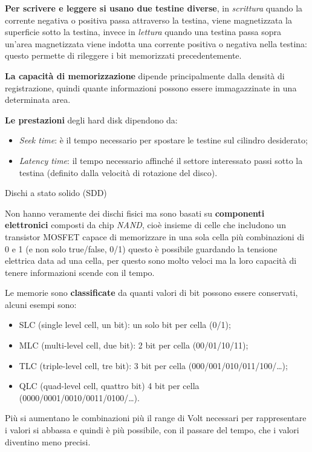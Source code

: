 \textbf{Per scrivere e leggere si usano due testine diverse}, in
\emph{scrittura} quando la corrente negativa o positiva passa attraverso
la testina, viene magnetizzata la superficie sotto la testina, invece in
\emph{lettura} quando una testina passa sopra un'area magnetizzata viene
indotta una corrente positiva o negativa nella testina: questo permette
di rileggere i bit memorizzati precedentemente.

\textbf{La capacità di memorizzazione} dipende principalmente dalla
densità di registrazione, quindi quante informazioni possono essere
immagazzinate in una determinata area.

\textbf{Le prestazioni} degli hard disk dipendono da:

\begin{itemize}
\item
  \emph{Seek time}: è il tempo necessario per spostare le testine sul
  cilindro desiderato;
\item
  \emph{Latency time}: il tempo necessario affinché il settore
  interessato passi sotto la testina (definito dalla velocità di
  rotazione del disco).
\end{itemize}

Dischi a stato solido (SDD)

Non hanno veramente dei dischi fisici ma sono basati su
\textbf{componenti elettronici} composti da chip \emph{NAND}, cioè
insieme di celle che includono un transistor MOSFET capace di
memorizzare in una sola cella più combinazioni di 0 e 1 (e non solo
true/false, 0/1) questo è possibile guardando la tensione elettrica data
ad una cella, per questo sono molto veloci ma la loro capacità di tenere
informazioni scende con il tempo.

Le memorie sono \textbf{classificate} da quanti valori di bit possono
essere conservati, alcuni esempi sono:

\begin{itemize}
\item
  SLC (single level cell, un bit): un solo bit per cella (0/1);
\item
  MLC (multi-level cell, due bit): 2 bit per cella (00/01/10/11);
\item
  TLC (triple-level cell, tre bit): 3 bit per cella
  (000/001/010/011/100/\ldots);
\item
  QLC (quad-level cell, quattro bit) 4 bit per cella
  (0000/0001/0010/0011/0100/\ldots).
\end{itemize}

Più si aumentano le combinazioni più il range di Volt necessari per
rappresentare i valori si abbassa e quindi è più possibile, con il
passare del tempo, che i valori diventino meno precisi.

